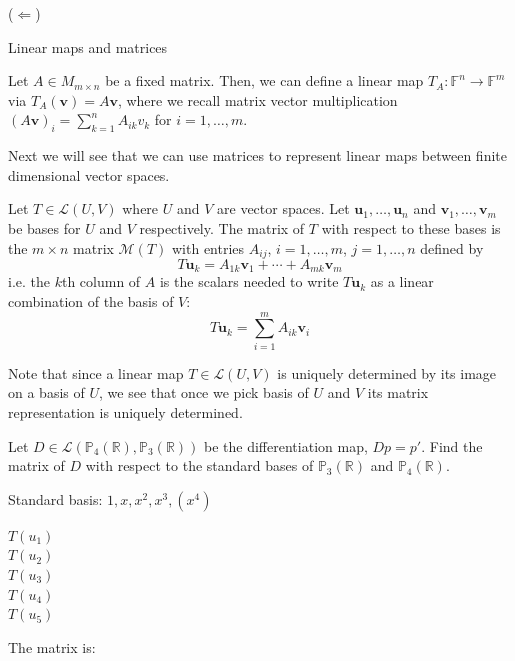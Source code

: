 \documentclass [aspectratio=169]{beamer}
\newcommand{\bu}{{\mathbf{u}}}
\newcommand{\bv}{{\mathbf{v}}}
\newcommand{\R}{{\mathbb{R}}}
\newcommand{\F}{{\mathbb{F}}}
\begin{document}
\begin{frame}
($\Leftarrow$) 
\vspace{6cm}
\end{frame}



\begin{frame}{Linear maps and matrices}
\begin{example}
Let $A\in M_{m\times n}$ be a fixed matrix. Then, we can define a linear map $T_A \colon \F^n \to \F^m$ via $T_A(\bv) = A \bv$, where we recall matrix vector multiplication $(A\bv)_i = \sum_{k=1}^n A_{ik}v_k$ for $i=1, \ldots, m$.
\end{example}

Next we will see that we can use matrices to represent linear maps between finite dimensional vector spaces. 

\end{frame}

\begin{frame}
\begin{definition}\label{def:matrix_rep}
Let $T \in \mathcal{L}(U,V)$ where $U$ and $V$ are vector spaces. Let $\bu_1, \ldots, \bu_n$ and $\bv_1, \ldots, \bv_m$ be bases for $U$ and $V$ respectively. The matrix of $T$ with respect to these bases is the $m \times n$ matrix $\mathcal{M}(T)$ with entries $A_{ij}$, $i = 1, \ldots, m$, $j = 1, \ldots, n$ defined by
\begin{equation*}
    T\bu_k = A_{1k} \bv_1 + \cdots + A_{mk} \bv_m
\end{equation*}
i.e. the $k$th column of $A$ is the scalars needed to write $T \bu_k$ as a linear combination of the basis of $V$:
\begin{equation*}
    T \bu_k = \sum_{i=1}^m A_{ik} \bv_i 
\end{equation*}
\end{definition}

Note that since a linear map $T\in \mathcal{L}(U,V)$ is uniquely determined by its image on a basis of $U$, we see that once we pick basis of $U$ and $V$ its matrix representation is uniquely determined. 

\end{frame}




\begin{frame}
\begin{example}
Let $D \in \mathcal{L}(\mathbb{P}_4(\R),\mathbb{P}_3(\R))$ be the differentiation map, $Dp = p'$. Find the matrix of $D$ with respect to the standard bases of $\mathbb{P}_3(\R)$ and $\mathbb{P}_4(\R)$.

Standard basis: $1, x, x^2, x^3, (x^4)$ 
\vspace{1em}

$T(u_1) $ \\
$T(u_2)  $ \\ 
$T(u_3) $ \\ 
$T(u_4) $ \\
$T(u_5) $
\vspace{1em}

The matrix is:
\vspace{2cm}
\end{example}

\end{frame}
\end{document}
